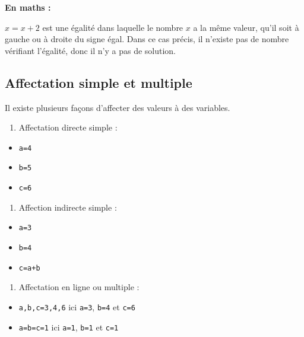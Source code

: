 \documentclass[11pt]{article}
\providecommand{\tightlist}{%
      \setlength{\itemsep}{0pt}\setlength{\parskip}{0pt}}
\begin{document}
\textbf{En maths :}

\(x=x+2\) est une égalité dans laquelle le nombre \(x\) a la même
valeur, qu'il soit à gauche ou à droite du signe égal. Dans ce cas
précis, il n'existe pas de nombre vérifiant l'égalité, donc il n'y a pas
de solution.

\hypertarget{affectation-simple-et-multiple}{%
\subsection{Affectation simple et
multiple}\label{affectation-simple-et-multiple}}

Il existe plusieurs façons d'affecter des valeurs à des variables.

\begin{enumerate}
\def\labelenumi{\arabic{enumi}.}
\tightlist
\item
  Affectation directe simple :
\end{enumerate}

\begin{itemize}
\tightlist
\item
  \texttt{a=4}
\item
  \texttt{b=5}
\item
  \texttt{c=6}
\end{itemize}

\begin{enumerate}
\def\labelenumi{\arabic{enumi}.}
\setcounter{enumi}{1}
\tightlist
\item
  Affection indirecte simple :
\end{enumerate}

\begin{itemize}
\tightlist
\item
  \texttt{a=3}
\item
  \texttt{b=4}
\item
  \texttt{c=a+b}
\end{itemize}

\begin{enumerate}
\def\labelenumi{\arabic{enumi}.}
\setcounter{enumi}{2}
\tightlist
\item
  Affectation en ligne ou multiple :
\end{enumerate}

\begin{itemize}
\tightlist
\item
  \texttt{a,b,c=3,4,6} ici \texttt{a=3}, \texttt{b=4} et \texttt{c=6}
\item
  \texttt{a=b=c=1} ici \texttt{a=1}, \texttt{b=1} et \texttt{c=1}
\end{itemize}
\end{document}
